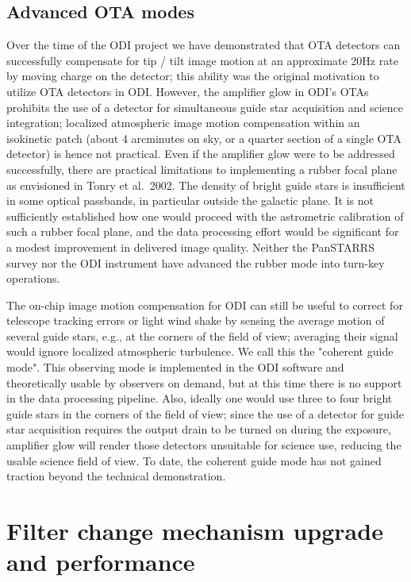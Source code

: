 \documentclass[]{spieman}
\begin{document}
\subsection{Advanced OTA modes}

Over the time of the ODI project we have demonstrated that OTA detectors can
successfully compensate for tip / tilt image motion at an approximate 20Hz rate
by moving charge on the detector; this ability was the original motivation to
utilize OTA detectors in ODI.  However, the amplifier glow in ODI's OTAs
prohibits the use of a detector for simultaneous guide star acquisition and
science integration; localized atmospheric image motion compensation within an
isokinetic patch (about 4 arcminutes on sky, or a quarter section of a single
OTA detector) is hence not practical. Even if the amplifier glow were to be
addressed successfully, there are practical limitations to implementing a rubber
focal plane as envisioned in Tonry et al.~2002\cite{tonry2002}. The density of 
bright guide stars is insufficient in some  optical passbands, in particular
outside the galactic plane. It is not sufficiently established how one would
proceed with the astrometric calibration of such a rubber focal plane, and the
data processing effort would be significant for a modest improvement in
delivered image quality. Neither the PanSTARRS survey nor the ODI instrument
have advanced the rubber mode into turn-key operations.

The on-chip image motion compensation for ODI can still be useful to correct for
telescope tracking errors or light wind shake by sensing the average motion of
several guide stars, e.g., at the corners of the field of view; averaging their
signal would ignore localized atmospheric turbulence. We call this the "coherent
guide mode"\cite{harbeck2014}. This observing mode is implemented in the ODI
software and theoretically usable by observers on demand, but at this time there
is no support in the  data processing pipeline. Also, ideally one would use
three to four bright guide stars in the corners of the field of view; since the
use of a detector for guide star acquisition requires the output drain to be
turned on during the exposure, amplifier glow will render those detectors
unsuitable for science use, reducing the usable science field of view. To date,
the coherent guide mode has not gained traction beyond the technical
demonstration.




\section{Filter change mechanism upgrade and performance}
\end{document}
